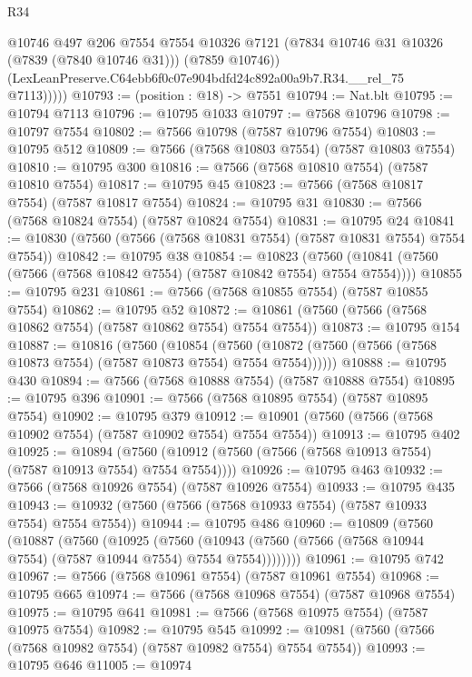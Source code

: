 \begin{lexlean}{R34}
\begin{coremodule}
              @10746
              @497
              @206
              @7554
              @7554
              @10326
              @7121
              (@7834 @10746 @31 @10326 (@7839 (@7840 @10746 @31)))
              (@7859 @10746))
            (LexLeanPreserve.C64ebb6f0c07e904bdfd24c892a00a9b7.R34.__rel_75 @7113)))))
@10793 := (position : @18) -> @7551
@10794 := Nat.blt
@10795 := @10794 @7113
@10796 := @10795 @1033
@10797 := @7568 @10796
@10798 := @10797 @7554
@10802 := @7566 @10798 (@7587 @10796 @7554)
@10803 := @10795 @512
@10809 := @7566 (@7568 @10803 @7554) (@7587 @10803 @7554)
@10810 := @10795 @300
@10816 := @7566 (@7568 @10810 @7554) (@7587 @10810 @7554)
@10817 := @10795 @45
@10823 := @7566 (@7568 @10817 @7554) (@7587 @10817 @7554)
@10824 := @10795 @31
@10830 := @7566 (@7568 @10824 @7554) (@7587 @10824 @7554)
@10831 := @10795 @24
@10841 := @10830 (@7560 (@7566 (@7568 @10831 @7554) (@7587 @10831 @7554) @7554 @7554))
@10842 := @10795 @38
@10854 := @10823
    (@7560 (@10841 (@7560 (@7566 (@7568 @10842 @7554) (@7587 @10842 @7554) @7554 @7554))))
@10855 := @10795 @231
@10861 := @7566 (@7568 @10855 @7554) (@7587 @10855 @7554)
@10862 := @10795 @52
@10872 := @10861 (@7560 (@7566 (@7568 @10862 @7554) (@7587 @10862 @7554) @7554 @7554))
@10873 := @10795 @154
@10887 := @10816
    (@7560
      (@10854
        (@7560 (@10872 (@7560 (@7566 (@7568 @10873 @7554) (@7587 @10873 @7554) @7554 @7554))))))
@10888 := @10795 @430
@10894 := @7566 (@7568 @10888 @7554) (@7587 @10888 @7554)
@10895 := @10795 @396
@10901 := @7566 (@7568 @10895 @7554) (@7587 @10895 @7554)
@10902 := @10795 @379
@10912 := @10901 (@7560 (@7566 (@7568 @10902 @7554) (@7587 @10902 @7554) @7554 @7554))
@10913 := @10795 @402
@10925 := @10894
    (@7560 (@10912 (@7560 (@7566 (@7568 @10913 @7554) (@7587 @10913 @7554) @7554 @7554))))
@10926 := @10795 @463
@10932 := @7566 (@7568 @10926 @7554) (@7587 @10926 @7554)
@10933 := @10795 @435
@10943 := @10932 (@7560 (@7566 (@7568 @10933 @7554) (@7587 @10933 @7554) @7554 @7554))
@10944 := @10795 @486
@10960 := @10809
    (@7560
      (@10887
        (@7560
          (@10925
            (@7560
              (@10943 (@7560 (@7566 (@7568 @10944 @7554) (@7587 @10944 @7554) @7554 @7554))))))))
@10961 := @10795 @742
@10967 := @7566 (@7568 @10961 @7554) (@7587 @10961 @7554)
@10968 := @10795 @665
@10974 := @7566 (@7568 @10968 @7554) (@7587 @10968 @7554)
@10975 := @10795 @641
@10981 := @7566 (@7568 @10975 @7554) (@7587 @10975 @7554)
@10982 := @10795 @545
@10992 := @10981 (@7560 (@7566 (@7568 @10982 @7554) (@7587 @10982 @7554) @7554 @7554))
@10993 := @10795 @646
@11005 := @10974

\end{coremodule}
\end{lexlean}
